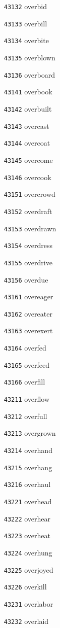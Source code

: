 \documentclass[twoside,11pt]{article}
\begin{document}
\begin{multicols}{5}
\begin{enumerate}
\item[\texttt{43132}] overbid
\item[\texttt{43133}] overbill
\item[\texttt{43134}] overbite
\item[\texttt{43135}] overblown
\item[\texttt{43136}] overboard
\item[\texttt{43141}] overbook
\item[\texttt{43142}] overbuilt
\item[\texttt{43143}] overcast
\item[\texttt{43144}] overcoat
\item[\texttt{43145}] overcome
\item[\texttt{43146}] overcook
\item[\texttt{43151}] overcrowd
\item[\texttt{43152}] overdraft
\item[\texttt{43153}] overdrawn
\item[\texttt{43154}] overdress
\item[\texttt{43155}] overdrive
\item[\texttt{43156}] overdue
\item[\texttt{43161}] overeager
\item[\texttt{43162}] overeater
\item[\texttt{43163}] overexert
\item[\texttt{43164}] overfed
\item[\texttt{43165}] overfeed
\item[\texttt{43166}] overfill
\item[\texttt{43211}] overflow
\item[\texttt{43212}] overfull
\item[\texttt{43213}] overgrown
\item[\texttt{43214}] overhand
\item[\texttt{43215}] overhang
\item[\texttt{43216}] overhaul
\item[\texttt{43221}] overhead
\item[\texttt{43222}] overhear
\item[\texttt{43223}] overheat
\item[\texttt{43224}] overhung
\item[\texttt{43225}] overjoyed
\item[\texttt{43226}] overkill
\item[\texttt{43231}] overlabor
\item[\texttt{43232}] overlaid

\end{enumerate}
\end{multicols}
\end{document}

